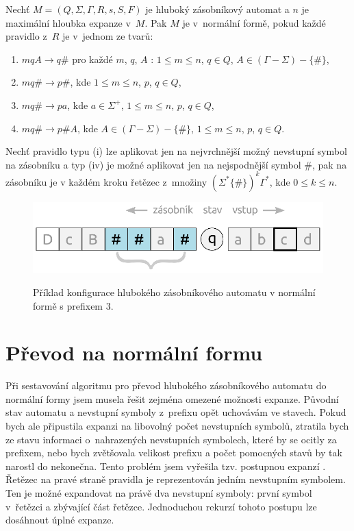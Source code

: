 \begin{Def}\label{def_NF}
Nechť $M = (Q,\Sigma,\Gamma, R, s, S , F)$ je hluboký zásobníkový automat
a $n$ je maximální hloubka expanze v~$M$.
Pak $M$ je v~normální formě, pokud každé pravidlo z~$R$ je v~jednom ze tvarů:

\begin{enumerate}
\renewcommand{\labelenumi}{(\roman{enumi})}

\item $mqA \rightarrow q\#$ pro každé $m$, $q$, $A$ : $1 \le m \le n$, $q \in Q$, $A \in (\Gamma - \Sigma) - \{\#\}$,
\item $mq\# \rightarrow p\#$, kde $1 \le m \le n$, $p$, $q \in Q$,
\item $mq\# \rightarrow pa$, kde $a \in {\Sigma}^+$, $1 \le m \le n$, $p$, $q \in Q$,
\item $mq\# \rightarrow p\#A$, kde $A \in (\Gamma - \Sigma) - \{\#\}$, $1 \le m \le n$, $p$, $q \in Q$.

\end{enumerate}

Nechť pravidlo typu (i) lze aplikovat jen na nejvrchnější možný nevstupní symbol na zásobníku a typ (iv) je možné aplikovat jen na nejspodnější symbol $\#$, pak na zásobníku je v každém kroku řetězec z~množiny $ ( \Sigma^* \{ \# \} )^k  \Gamma^*$, kde $0 \le k \le n$. 

\end{Def}


\begin{figure}[ht]
\centering
\includegraphics{img/bp_pda04.eps} \bigskip \\
\caption{Příklad konfigurace hlubokého zásobníkového automatu v normální formě s prefixem 3.}
\end{figure}

\section{Převod na normální formu}

Při sestavování algoritmu pro převod hlubokého zásobníkového automatu do normální formy jsem musela řešit zejména omezené možnosti expanze. Původní stav automatu a nevstupní symboly z~prefixu opět uchovávám ve stavech. Pokud bych ale připustila expanzi na libovolný počet nevstupních symbolů, ztratila bych ze stavu informaci o~nahrazených nevstupních symbolech, které by se ocitly za prefixem, nebo bych zvětšovala velikost prefixu a počet pomocných stavů by tak narostl do nekonečna. Tento problém jsem vyřešila tzv. postupnou expanzí \cite{Meduna:Theory}. Řetězec na pravé straně pravidla je reprezentován jedním nevstupním symbolem. Ten je možné expandovat na právě dva nevstupní symboly: první symbol v~řetězci a zbývající část řetězce. Jednoduchou rekurzí tohoto postupu lze dosáhnout úplné expanze.

